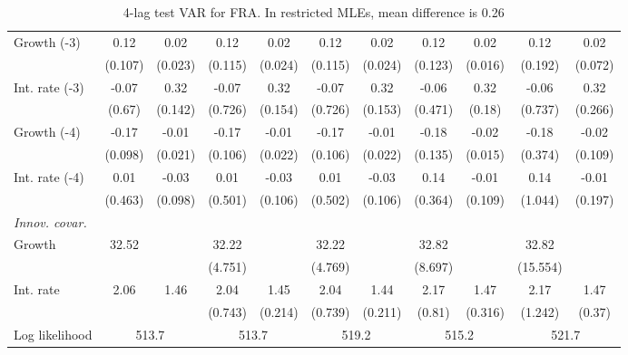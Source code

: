 \begin{table}[htbp]
\begin{tabular}{@{\extracolsep{4pt}}lcccccccccc@{}}
\quad Growth (-3) 	 &0.12 	 & 0.02 	 & 0.12 	 & 0.02 	 & 0.12 	 & 0.02 	 & 0.12 	 & 0.02 	 & 0.12 	 & 0.02	 \\ 
 		 & (0.107) 	 & (0.023) 	 & (0.115) 	 & (0.024) 	 & (0.115) 	 & (0.024) 	 & (0.123) 	 & (0.016) 	 & (0.192) 	 & (0.072) 	 \\ 
\quad Int. rate (-3) 	 &-0.07 	 & 0.32 	 & -0.07 	 & 0.32 	 & -0.07 	 & 0.32 	 & -0.06 	 & 0.32 	 & -0.06 	 & 0.32	 \\ 
 		 & (0.67) 	 & (0.142) 	 & (0.726) 	 & (0.154) 	 & (0.726) 	 & (0.153) 	 & (0.471) 	 & (0.18) 	 & (0.737) 	 & (0.266) 	 \\ 
\quad Growth (-4) 	 &-0.17 	 & -0.01 	 & -0.17 	 & -0.01 	 & -0.17 	 & -0.01 	 & -0.18 	 & -0.02 	 & -0.18 	 & -0.02	 \\ 
 		 & (0.098) 	 & (0.021) 	 & (0.106) 	 & (0.022) 	 & (0.106) 	 & (0.022) 	 & (0.135) 	 & (0.015) 	 & (0.374) 	 & (0.109) 	 \\ 
\quad Int. rate (-4) 	 &0.01 	 & -0.03 	 & 0.01 	 & -0.03 	 & 0.01 	 & -0.03 	 & 0.14 	 & -0.01 	 & 0.14 	 & -0.01	 \\ 
 		 & (0.463) 	 & (0.098) 	 & (0.501) 	 & (0.106) 	 & (0.502) 	 & (0.106) 	 & (0.364) 	 & (0.109) 	 & (1.044) 	 & (0.197) 	 \\ 
\rule{0pt}{4ex} \emph{Innov. covar.}  	 & 	 & 	 & 	 & 	 & 	 & 	 & 	 & 	 & 	 &\\ 
\quad Growth 	 &32.52 	 &  	 & 32.22 	 &  	 & 32.22 	 &  	 & 32.82 	 &  	 & 32.82 	 & 	 \\ 
 		 &  	 &  	 & (4.751) 	 &  	 & (4.769) 	 &  	 & (8.697) 	 &  	 & (15.554) 	 &  	 \\ 
\quad Int. rate 	 &2.06 	 & 1.46 	 & 2.04 	 & 1.45 	 & 2.04 	 & 1.44 	 & 2.17 	 & 1.47 	 & 2.17 	 & 1.47	 \\ 
 		 &  	 &  	 & (0.743) 	 & (0.214) 	 & (0.739) 	 & (0.211) 	 & (0.81) 	 & (0.316) 	 & (1.242) 	 & (0.37) 	 \\ 
 \hline \rule{0pt}{4ex} 
  Log likelihood 	 &\multicolumn{2}{c}{513.7} 	 & \multicolumn{2}{c}{513.7} 	 & \multicolumn{2}{c}{519.2} 	 & \multicolumn{2}{c}{515.2} 	 & \multicolumn{2}{c}{521.7}\\ 

 \hline 	\end{tabular}		\caption{4-lag test VAR for FRA. In restricted MLEs, mean difference is 0.26}
		\label{tab:FRA4}

\end{table}